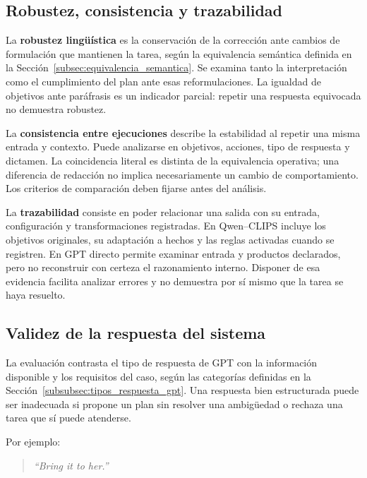\subsection{Robustez, consistencia y trazabilidad}
\label{subsec:robustez_consistencia_trazabilidad}

La \textbf{robustez lingüística} es la conservación de la corrección ante cambios de formulación que mantienen la tarea, según la equivalencia semántica definida en la Sección~\ref{subsec:equivalencia_semantica}. Se examina tanto la interpretación como el cumplimiento del plan ante esas reformulaciones. La igualdad de objetivos ante paráfrasis es un indicador parcial: repetir una respuesta equivocada no demuestra robustez.

La \textbf{consistencia entre ejecuciones} describe la estabilidad al repetir una misma entrada y contexto. Puede analizarse en objetivos, acciones, tipo de respuesta y dictamen. La coincidencia literal es distinta de la equivalencia operativa; una diferencia de redacción no implica necesariamente un cambio de comportamiento. Los criterios de comparación deben fijarse antes del análisis.

La \textbf{trazabilidad} consiste en poder relacionar una salida con su entrada, configuración y transformaciones registradas. En Qwen--CLIPS incluye los objetivos originales, su adaptación a hechos y las reglas activadas cuando se registren. En GPT directo permite examinar entrada y productos declarados, pero no reconstruir con certeza el razonamiento interno. Disponer de esa evidencia facilita analizar errores y no demuestra por sí mismo que la tarea se haya resuelto.

\subsection{Validez de la respuesta del sistema}
\label{subsec:validez_respuesta}

La evaluación contrasta el tipo de respuesta de GPT con la información disponible y los requisitos del caso, según las categorías definidas en la Sección~\ref{subsubsec:tipos_respuesta_gpt}. Una respuesta bien estructurada puede ser inadecuada si propone un plan sin resolver una ambigüedad o rechaza una tarea que sí puede atenderse.

Por ejemplo:

\begin{quote}
\textit{``Bring it to her.''}
\end{quote}

